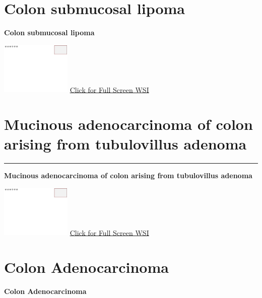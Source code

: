 \documentclass[
  letterpaper,
  paper=6in:9in,
  pagesize=pdftex,
  headinclude=on,
  footinclude=on,
  12pt]{scrbook}
\begin{document}
\hypertarget{sec-colon-submucosal-lipoma}{%
\chapter{Colon submucosal lipoma}\label{sec-colon-submucosal-lipoma}}

\textbf{Colon submucosal lipoma}

\href{https://images.patolojiatlasi.com/template/HE.html}{\includegraphics[width=0.25\textwidth,height=\textheight]{./screenshots/template_screenshot.png}}
\href{https://images.patolojiatlasi.com/colon-submucosal-lipoma/HE.html}{Click
for Full Screen WSI}

\hypertarget{sec-adenocarcinoma-arising-tubulovillous-adenoma}{%
\chapter{Mucinous adenocarcinoma of colon arising from tubulovillus
adenoma}\label{sec-adenocarcinoma-arising-tubulovillous-adenoma}}

\begin{center}\rule{0.5\linewidth}{0.5pt}\end{center}

\textbf{Mucinous adenocarcinoma of colon arising from tubulovillus
adenoma}

\href{https://images.patolojiatlasi.com/template/HE.html}{\includegraphics[width=0.25\textwidth,height=\textheight]{./screenshots/template_screenshot.png}}
\href{https://images.patolojiatlasi.com/mucinous-adenocarcinoma-colon/HE.html}{Click
for Full Screen WSI}

\hypertarget{sec-colon-adenocarcinoma}{%
\chapter{Colon Adenocarcinoma}\label{sec-colon-adenocarcinoma}}

\textbf{Colon Adenocarcinoma}
\end{document}

